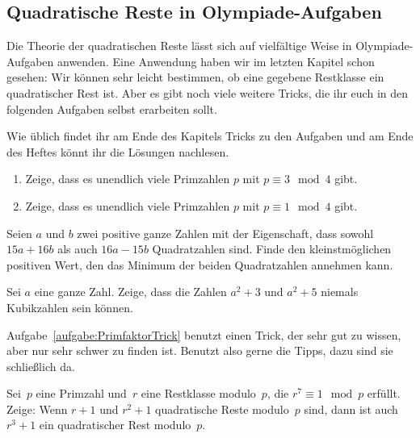 \subsection*{Quadratische Reste in Olympiade-Aufgaben}

Die Theorie der quadratischen Reste lässt sich auf vielfältige Weise in Olympiade-Aufgaben anwenden. Eine Anwendung haben wir im letzten Kapitel schon gesehen: Wir können sehr leicht bestimmen, ob eine gegebene Restklasse ein quadratischer Rest ist. Aber es gibt noch viele weitere Tricks, die ihr euch in den folgenden Aufgaben selbst erarbeiten sollt.

Wie üblich findet ihr am Ende des Kapitels Tricks zu den Aufgaben und am Ende des Heftes könnt ihr die Lösungen nachlesen.

\begin{aufgabe*}\leavevmode\label{aufgabe:PrimzahlsatzVonDirichletMod4}
	\begin{enumerate}[label={$(\alph*)$},ref={$(\alph*)$}]
		\item Zeige, dass es unendlich viele Primzahlen $p$ mit $p\equiv 3\mod 4$ gibt.\label{teilaufgabe:3Mod4}
		\item Zeige, dass es unendlich viele Primzahlen $p$ mit $p\equiv 1\mod 4$ gibt.\label{teilaufgabe:1Mod4}
	\end{enumerate}
\end{aufgabe*}
\begin{aufgabe*}[*]\label{aufgabe:IMO1996_4}
	Seien $a$ und $b$ zwei positive ganze Zahlen mit der Eigenschaft, dass sowohl $15a+16b$ als auch $16a-15b$ Quadratzahlen sind. Finde den kleinstmöglichen positiven Wert, den das Minimum der beiden Quadratzahlen annehmen kann.
\end{aufgabe*}
\begin{aufgabe*}[*]\label{aufgabe:PrimfaktorTrick}
	Sei $a$ eine ganze Zahl. Zeige, dass die Zahlen $a^2+3$ und $a^2+5$ niemals Kubikzahlen sein können.
\end{aufgabe*}
Aufgabe~\ref{aufgabe:PrimfaktorTrick} benutzt einen Trick, der sehr gut zu wissen, aber nur sehr schwer zu finden ist. Benutzt also gerne die Tipps, dazu sind sie schließlich da.
\begin{aufgabe*}[**]\label{aufgabe:Polen2019}
	Sei~$p$ eine Primzahl und~$r$ eine Restklasse modulo~$p$, die $r^7\equiv 1\mod p$ erfüllt. Zeige: Wenn $r+1$ und $r^2+1$ quadratische Reste modulo~$p$ sind, dann ist auch $r^3+1$ ein quadratischer Rest modulo~$p$.
\end{aufgabe*}

